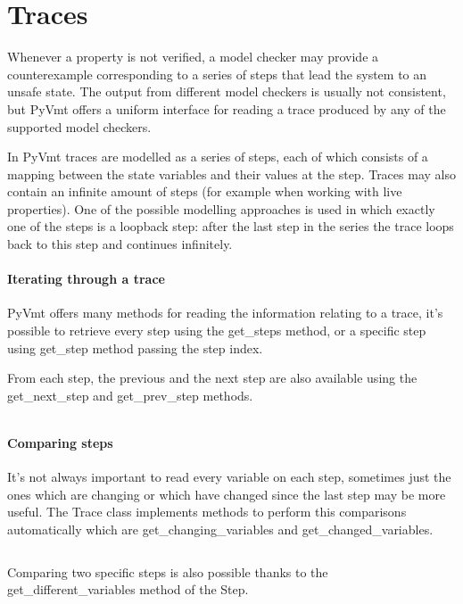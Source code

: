 \section{Traces}
Whenever a property is not verified, a model checker may provide a counterexample corresponding to a series of steps that lead the system to an unsafe state.
The output from different model checkers is usually not consistent, but PyVmt offers a uniform interface for reading a trace produced by any of the supported model checkers.

In PyVmt traces are modelled as a series of steps, each of which consists of a mapping between the state variables and their values at the step.
Traces may also contain an infinite amount of steps (for example when working with live properties).
One of the possible modelling approaches is used in which exactly one of the steps is a loopback step: after the last step in the series the trace loops back to this step and continues infinitely.

\paragraph*{Iterating through a trace}
PyVmt offers many methods for reading the information relating to a trace, it's possible to retrieve every step using the get\_steps method, or a specific step using get\_step method passing the step index.

From each step, the previous and the next step are also available using the get\_next\_step and get\_prev\_step methods.

\inputminted[firstline=22, lastline=39]{python3}{py/model_checking.py}

\paragraph*{Comparing steps}
It's not always important to read every variable on each step, sometimes just the ones which are changing or which have changed since the last step may be more useful.
The Trace class implements methods to perform this comparisons automatically which are get\_changing\_variables and get\_changed\_variables.

\inputminted[firstline=41, lastline=48]{python3}{py/model_checking.py}

Comparing two specific steps is also possible thanks to the get\_different\_variables method of the Step.

\inputminted[firstline=51, lastline=55]{python3}{py/model_checking.py}

